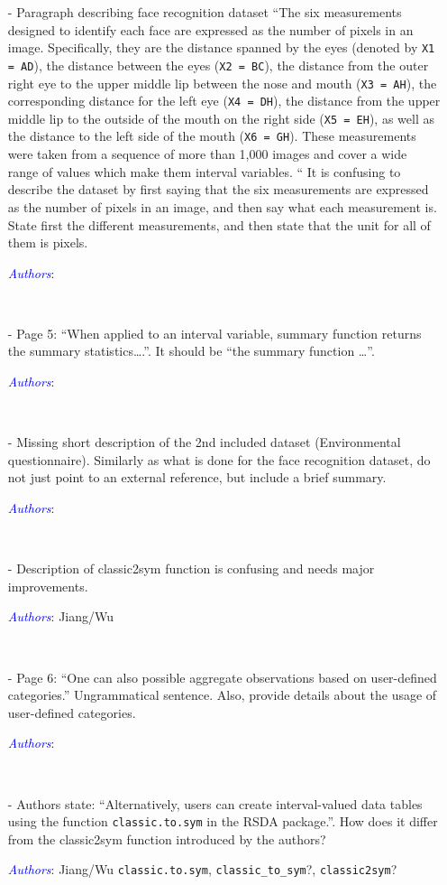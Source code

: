 \documentclass[11pt]{article}
\newcommand{\authors}[1]{

 \parbox{15cm}{\textcolor{blue}{\it Authors}: \color{red}#1}
 \\ \vspace{0.3cm}
}
\begin{document}
\begin{itemize}
{}


\item[-] Paragraph describing face recognition dataset “The six measurements designed to identify each face are expressed as the number of pixels in an image. Specifically, they are the distance spanned by the eyes (denoted by {\tt X1 = AD}), the distance between the eyes ({\tt X2 = BC}), the distance from the outer right eye to the upper middle lip between the nose and mouth ({\tt X3 = AH}), the corresponding distance for the left eye ({\tt X4 = DH}), the distance from the upper middle lip to the outside of the mouth on the right side ({\tt X5 = EH}), as well as the distance to the left side of the mouth ({\tt X6 = GH}). These measurements were taken from a sequence of more than 1,000 images and cover a wide range of values which make them interval variables. “ It is confusing to describe the dataset by first saying that the six measurements are expressed as the number of pixels in an image, and then say what each measurement is. State first the different measurements, and then state that the unit for all of them is pixels. 
\authors{

}


\item[-] Page 5: “When applied to an interval variable, summary function returns the summary statistics….”. It should be “the summary function …”. 
\authors{

}


\item[-] Missing short description of the 2nd included dataset (Environmental questionnaire). Similarly as what is done for the face recognition dataset, do not just point to an external reference, but include a brief summary. 
\authors{

}



\item[-] Description of classic2sym function is confusing and needs major improvements. 
\authors{Jiang/Wu

}


\item[-] Page 6: “One can also possible aggregate observations based on user-defined categories.” Ungrammatical sentence. Also, provide details about the usage of user-defined categories. 
\authors{

}


\item[-] Authors state: “Alternatively, users can create interval-valued data tables using the function {\tt classic.to.sym} in the RSDA package.”. How does it differ from the classic2sym function introduced by the authors? 
\authors{Jiang/Wu
{\tt classic.to.sym}, {\tt classic\_to\_sym}?, {\tt classic2sym}?
}




\end{itemize}
\end{document}
